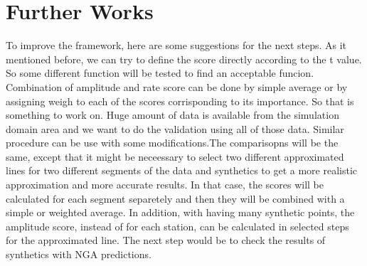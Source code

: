 
\section{Further Works}

To improve the framework, here are some suggestions for the next steps. As it mentioned before, we can try to define the score directly according to the t value. So some different function will be tested to find an acceptable funcion.
Combination of amplitude and rate score can be done by simple average or by assigning weigh to each of the scores corrisponding to its importance. So that is something to work on.
Huge amount of data is available from the simulation domain area and we want to do the validation using all of those data. Similar procedure can be use with some modifications.The  comparisopns will be the same, except that it might be neceessary to select two different approximated lines for two different segments of the data and synthetics to get a more realistic approximation and more accurate results. In that case, the scores will be calculated for each segment separetely and then they will be combined with a simple or weighted average. In addition, with having many synthetic points, the amplitude score, instead of for each station, can be calculated in selected steps for the approximated line. The next step would be to check the results of synthetics with NGA predictions.


